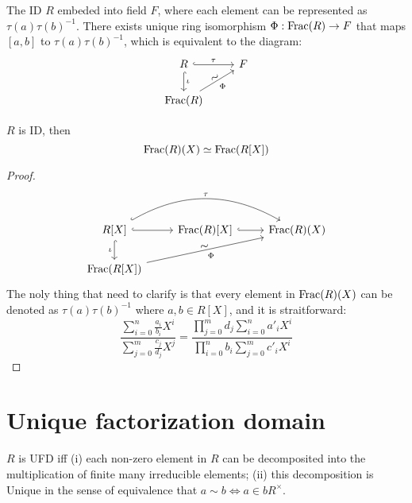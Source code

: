 \begin{corollary}
    The ID $R$ embeded into field $F$, where each element can be represented as $\tau(a) \tau(b)^{-1}$. There exists unique ring isomorphism $\Phi: \operatorname{Frac}(R) \to F$ that maps $[a, b]$ to $\tau(a)\tau(b)^{-1}$, which is equivalent to the diagram:
    \[
        \begin{tikzcd}
            R \arrow[hook, r, "\tau"]  \arrow[hook, d, "\iota"]
            & F
            \\
            \Frac(R)  \arrow[ru, "\Phi"']  \arrow[ru, phantom, sloped, yshift=0.7ex, "\sim"]
        \end{tikzcd}
    \]
\end{corollary}





\begin{proposition}
    $R$ is ID, then
    \[
        \operatorname{Frac}(R)(X) \simeq \operatorname{Frac}(R[X])
    \]
\end{proposition}
\begin{proof}
    \[
        \begin{tikzcd}
            R[X]  \arrow[r, hook]  \arrow[rr, bend left, hook, "\tau"]  \arrow[d, hook, "\iota"']
            & \Frac(R)[X]  \arrow[r, hook]
            & \Frac(R)(X)
            \\
            \Frac(R[X])  \arrow[rru, "\Phi"']  \arrow[rru, phantom, sloped, yshift=0.7ex, "\sim"]
        \end{tikzcd}
    \]
    The noly thing that need to clarify is that every element in $\operatorname{Frac}(R)(X)$ can be denoted as $\tau(a)\tau(b)^{-1}$ where $a, b \in R[X]$, and it is straitforward:
    \[
        \frac{
            \sum_{i=0}^{n} \frac{a_i}{b_i} X^i
        }{
            \sum_{j=0}^{m} \frac{c_j}{d_j} X^j
        }=
        \frac{
            \prod_{j=0}^{m} d_j \sum_{i=0}^{n} a'_iX^i
        }{
            \prod_{i=0}^{n} b_i \sum_{j=0}^{m} c'_iX^i
        }
    \]
\end{proof}











\section{Unique factorization domain}
\begin{definition}
    $R$ is UFD iff (i) each non-zero element in $R$ can be decomposited into the multiplication of finite many irreducible elements; (ii) this decomposition is Unique in the sense of equivalence that $a \sim b \Leftrightarrow a \in bR^{\times}$.
\end{definition}


